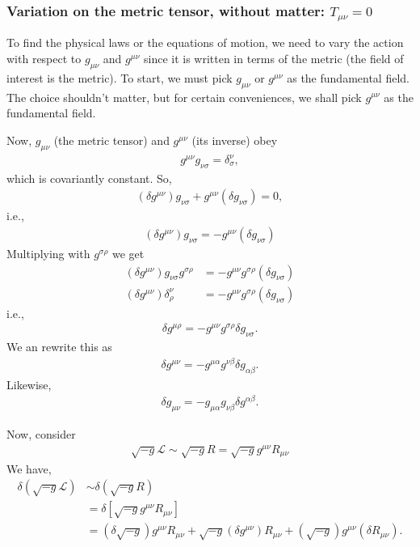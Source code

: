 \documentclass[a4paper,11pt]{article}
\numberwithin{equation}{section}
\theoremstyle{definition}
\newcommand{\lag}{\mathcal{L}}
\newcommand{\nn}{\nonumber}
\newcommand{\lb}{\left[}
\newcommand{\rb}{\right]}
\begin{document}
\subsubsection{Variation on the metric tensor, without matter: $T_{\mu\nu} = 0$}

To find the physical laws or the equations of motion, we need to vary the action with respect to $g_{\mu\nu}$ and $g^{\mu\nu}$ since it is written in terms of the metric (the field of interest is the metric). To start, we must pick $g_{\mu\nu}$ or $g^{\mu\nu}$ as the fundamental field. The choice shouldn't matter, but for certain conveniences, we shall pick $g^{\mu\nu}$ as the fundamental field. 

Now, $g_{\mu\nu}$ (the metric tensor) and $g^{\mu\nu}$ (its inverse) obey
\begin{align}
g^{\mu\nu}g_{\nu\sigma} = \delta^\nu_\sigma,
\end{align}  
which is covariantly constant. So,
\begin{align}
(\delta g^{\mu\nu}) g_{\nu\sigma} + g^{\mu\nu}(\delta g_{\nu\sigma}) = 0,
\end{align}
i.e.,
\begin{align}
(\delta g^{\mu\nu}) g_{\nu\sigma} = -g^{\mu\nu}(\delta g_{\nu\sigma})
\end{align}
Multiplying with $g^{\sigma\rho}$ we get
\begin{align}
(\delta g^{\mu\nu})g_{\nu\sigma}g^{\sigma\rho} &= -g^{\mu\nu}g^{\sigma\rho}(\delta g_{\nu\sigma})\\
(\delta g^{\mu\nu})\delta^\nu_\rho &=  -g^{\mu\nu}g^{\sigma\rho}(\delta g_{\nu\sigma})
\end{align}
i.e.,
\begin{align}
\delta g^{\mu\rho} = -g^{\mu\nu}g^{\sigma\rho}\delta g_{\nu\sigma}.
\end{align}
We an rewrite this as
\begin{align}
\delta g^{\mu\nu} = -g^{\mu\alpha} g^{\nu\beta}\delta g_{\alpha\beta}.
\end{align}
Likewise, 
\begin{align}
\delta g_{\mu\nu} = -g_{\mu\alpha}g_{\nu\beta}\delta g^{\alpha\beta}.
\end{align}

Now, consider 
\begin{align}
\sqrt{-g}\lag \sim \sqrt{-g}R = \sqrt{-g}g^{\mu\nu}R_{\mu\nu}
\end{align}
We have,
\begin{align}
\delta(\sqrt{-g}\lag) &\sim \delta (\sqrt{-g} R)\nn\\
&=\delta\lb \sqrt{-g}g^{\mu\nu}R_{\mu\nu} \rb\nn\\
&= (\delta \sqrt{-g})g^{\mu\nu}R_{\mu\nu} + \sqrt{-g}(\delta g^{\mu\nu})R_{\mu\nu} + (\sqrt{-g})g^{\mu\nu}(\delta R_{\mu\nu}).  
\end{align}
\end{document}
